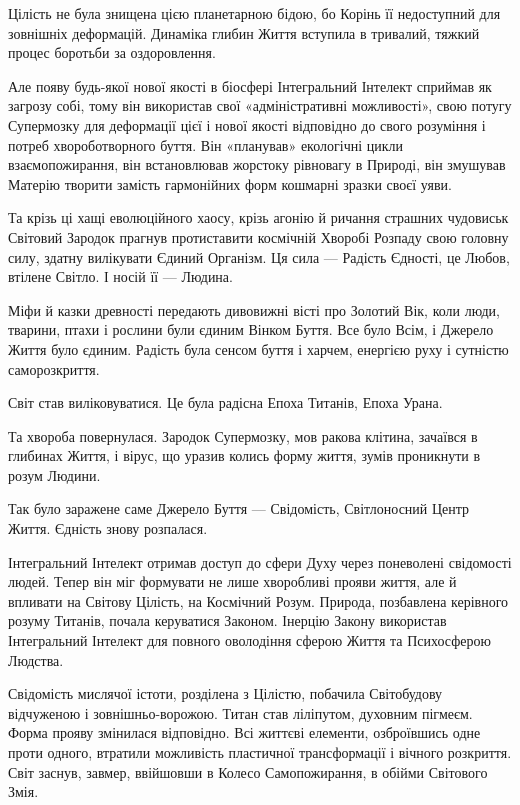 Цілість не була знищена цією планетарною бідою, бо Корінь її недоступний для
зовнішніх деформацій. Динаміка глибин Життя вступила в тривалий, тяжкий процес
боротьби за оздоровлення.

Але появу будь-якої нової якості в біосфері Інтегральний Інтелект сприймав як
загрозу собі, тому він використав свої «адміністративні можливості», свою
потугу Супермозку для деформації цієї і нової якості відповідно до свого
розуміння і потреб хвороботворного буття. Він «планував» екологічні цикли
взаємопожирання, він встановлював жорстоку рівновагу в Природі, він змушував
Матерію творити замість гармонійних форм кошмарні зразки своєї уяви.

Та крізь ці хащі еволюційного хаосу, крізь агонію й ричання страшних чудовиськ
Світовий Зародок прагнув протиставити космічній Хворобі Розпаду свою головну
силу, здатну вилікувати Єдиний Організм. Ця сила — Радість Єдності, це Любов,
втілене Світло. І носій її — Людина.

Міфи й казки древності передають дивовижні вісті про Золотий Вік, коли люди,
тварини, птахи і рослини були єдиним Вінком Буття. Все було Всім, і Джерело
Життя було єдиним. Радість була сенсом буття і харчем, енергією руху і сутністю
саморозкриття.

Світ став виліковуватися. Це була радісна Епоха Титанів, Епоха Урана.

Та хвороба повернулася. Зародок Супермозку, мов ракова клітина, зачаївся в
глибинах Життя, і вірус, що уразив колись форму життя, зумів проникнути в розум
Людини.

Так було заражене саме Джерело Буття — Свідомість, Світлоносний Центр Життя.
Єдність знову розпалася.

Інтегральний Інтелект отримав доступ до сфери Духу через поневолені свідомості
людей. Тепер він міг формувати не лише хворобливі прояви життя, але й впливати
на Світову Цілість, на Космічний Розум. Природа, позбавлена керівного розуму
Титанів, почала керуватися Законом. Інерцію Закону використав Інтегральний
Інтелект для повного оволодіння сферою Життя та Психосферою Людства.

Свідомість мислячої істоти, розділена з Цілістю, побачила Світобудову
відчуженою і зовнішньо-ворожою. Титан став ліліпутом, духовним пігмеєм. Форма
прояву змінилася відповідно. Всі життєві елементи, озброївшись одне проти
одного, втратили можливість пластичної трансформації і вічного розкриття. Світ
заснув, завмер, ввійшовши в Колесо Самопожирання, в обійми Світового Змія.

